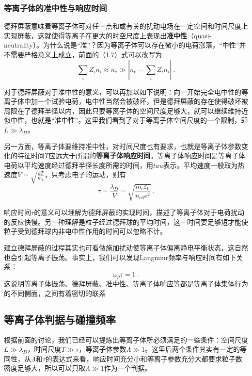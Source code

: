 \subsubsection{等离子体的准中性与响应时间}
德拜屏蔽意味着等离子体可对任一点和或有关的扰动电场在一定空间和时间尺度上实现屏蔽，这就使得等离子在更大的时空尺度上表现出\textbf{准中性}（quasi-neutrality）。为什么说是“准”？因为等离子体可以存在微小的电荷涨落，“中性”并不需要严格意义上成立，前面的（1.7）式可以改写为
			\begin{equation} 
			\sum_i Z_in_{i}\approx n_e\gg \left|n_e-\sum_i Z_in_{i}\right|~.
			\end{equation}
			
对于德拜屏蔽对于准中性的意义，可以再加以如下说明：向一开始完全电中性的等离子体中加一个试验电荷，电中性当然会被破坏，但是德拜屏蔽的存在使得破坏被局限在了德拜半径以内，因此只要等离子体的空间尺度足够大，就可以继续维持近似中性，也就是“准中性”。这里我们看到了对于等离子体空间尺度的一个限制，即$L\gg \lambda_D$。
			
另一方面，等离子体要维持准中性，对时间尺度也有要求，也就是等离子体参数变化的特征时间$T$应远大于所谓的\textbf{等离子体响应时间}。等离子体响应时间是等离子体电荷以平均速度经过德拜半径长度所需的时间，用$tau$表示。平均速度一般取为热速度$V=\sqrt{\frac{kT}{m_e}}$，只考虑电子的运动，则有
			\begin{equation} 
			\tau=\frac{\lambda_D}{V}=\sqrt{\frac{m_e\varepsilon_0}{n_{e0}e^2}}~.
			\end{equation}
			
响应时间$\tau$的意义可以理解为德拜屏蔽的实现时间，描述了等离子体对于电荷扰动的反应快慢。另一种理解是粒子经过德拜球的平均时间，这一时间要足够短才能使粒子受到德拜球内非电中性作用的时间可以忽略不计。
			
建立德拜屏蔽的过程其实也可看做施加扰动使等离子体偏离静电平衡状态，这自然也会引起等离子振荡。事实上，我们可以发现Langmiur频率与响应时间有如下关系：
			\begin{equation} 
			\omega_p \tau=1~.
			\end{equation}
			这说明等离子体振荡、德拜屏蔽、准中性、等离子体响应等都是等离子体集体行为的不同侧面，之间有着密切的联系
			
\subsection{等离子体判据与碰撞频率}
根据前面的讨论，我们已经可以提炼出等离子体所必须满足的一些条件：空间尺度$L\gg \lambda_D$，时间尺度$T\gg\tau$，等离子体参数$\varLambda\gg1$。这里后两个条件其实有一定的等同性，从$\varLambda$和$\tau$的表达式来看，响应时间充分小和等离子参数充分大都要求粒子数密度足够大，所以可以只取$\varLambda\gg1$作为一个判据。
		
